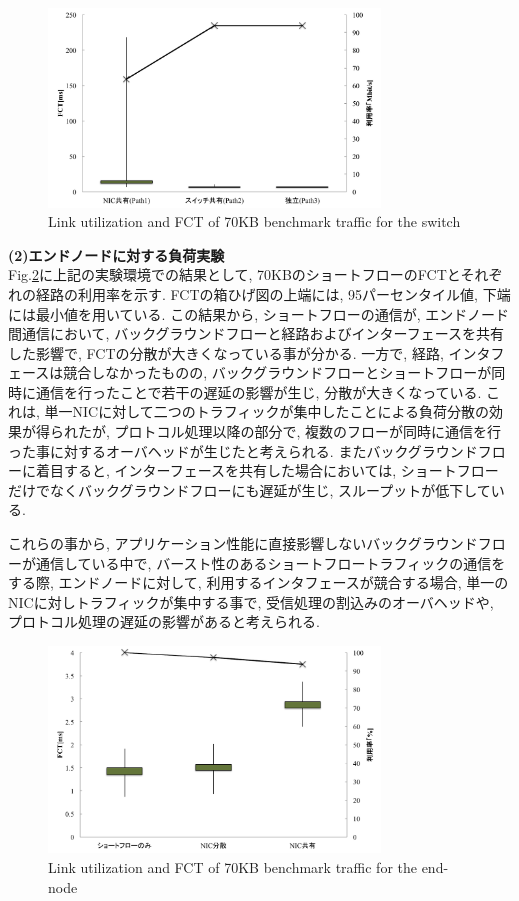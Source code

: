 \begin{figure}[t]
    \begin{center}
    \includegraphics[autoebb, width=250pt]{./img/switch_verif.pdf}
    \caption{Link utilization and FCT of 70KB benchmark traffic for the switch}
    \label{fig:improve}
    \end{center}
\end{figure}


{\bf (2)エンドノードに対する負荷実験}\\
Fig.\ref{fig:real_exp0}に上記の実験環境での結果として,
70KBのショートフローのFCTとそれぞれの経路の利用率を示す.
FCTの箱ひげ図の上端には, 95パーセンタイル値, 下端には最小値を用いている.
この結果から, ショートフローの通信が, エンドノード間通信において, バックグラウンドフローと経路およびインターフェースを共有した影響で,
FCTの分散が大きくなっている事が分かる.
一方で, 経路, インタフェースは競合しなかったものの, バックグラウンドフローとショートフローが同時に通信を行ったことで若干の遅延の影響が生じ,
分散が大きくなっている.
これは, 単一NICに対して二つのトラフィックが集中したことによる負荷分散の効果が得られたが, プロトコル処理以降の部分で,
複数のフローが同時に通信を行った事に対するオーバヘッドが生じたと考えられる.
またバックグラウンドフローに着目すると, インターフェースを共有した場合においては,
ショートフローだけでなくバックグラウンドフローにも遅延が生じ, スループットが低下している.

これらの事から, アプリケーション性能に直接影響しないバックグラウンドフローが通信している中で,
バースト性のあるショートフロートラフィックの通信をする際, エンドノードに対して, 利用するインタフェースが競合する場合,
単一のNICに対しトラフィックが集中する事で, 受信処理の割込みのオーバヘッドや, プロトコル処理の遅延の影響があると考えられる.


\begin{figure}[t]
    \begin{center}
    \includegraphics[autoebb, width=250pt]{./img/real_eth0.pdf}
    \caption{Link utilization and FCT of 70KB benchmark traffic for the
    end-node}
    \label{fig:real_exp0}
    \end{center}
\end{figure}

